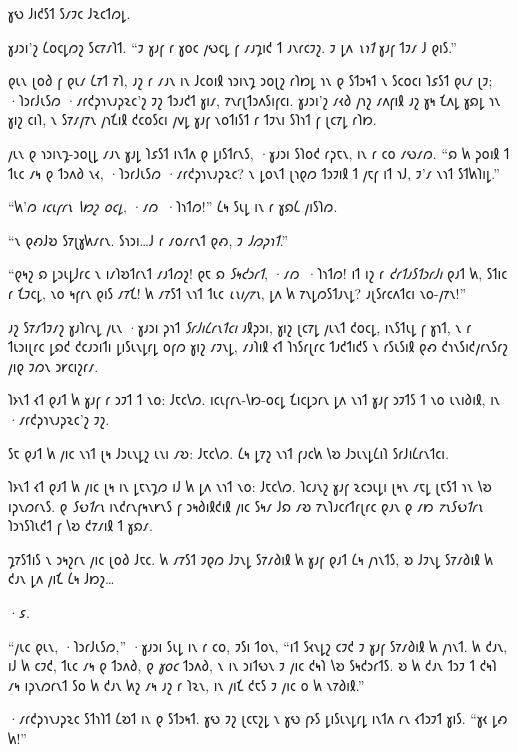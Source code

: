 𐑣𐑻 𐑓𐑦𐑒𐑕𐑑 𐑕𐑥𐑲𐑤 𐑓𐑷𐑤𐑑𐑼𐑛.

𐑣𐑨𐑮𐑦'𐑟 𐑖𐑴𐑤𐑛𐑼𐑟 𐑕𐑤𐑳𐑥𐑐𐑑. “𐑲 𐑣𐑨𐑝 𐑩 𐑣𐑴𐑤 𐑢𐑻𐑤𐑛 𐑝 𐑥𐑨𐑡𐑦𐑒 𐑑 𐑨𐑯𐑩𐑤𐑲𐑟. 𐑲 𐑛𐑵 \emph{𐑯𐑪𐑑} 𐑣𐑨𐑝 𐑑𐑲𐑥 𐑓 𐑞𐑦𐑕.”

𐑞𐑧𐑯 𐑚𐑴𐑔 𐑝 𐑞𐑧𐑥 𐑖𐑳𐑑 𐑳𐑐, 𐑨𐑟 𐑩 𐑥𐑨𐑯 𐑦𐑯 𐑓𐑤𐑴𐑦𐑙 𐑪𐑮𐑦𐑯𐑡 𐑮𐑴𐑚𐑟 𐑩𐑐𐑽𐑛 𐑪𐑯 𐑞 𐑕𐑑𐑮𐑰𐑑 𐑯 𐑕𐑤𐑴𐑤𐑦 𐑐𐑭𐑕𐑑 𐑞𐑧𐑥 𐑚𐑲; ·𐑐𐑮𐑩𐑓𐑧𐑕𐑼 ·𐑥𐑩𐑒𐑜𐑪𐑯𐑨𐑜𐑷𐑤'𐑟 𐑲𐑟 𐑑𐑮𐑨𐑒𐑑 𐑣𐑦𐑥, 𐑳𐑯𐑩𐑚𐑑𐑮𐑵𐑕𐑦𐑝𐑤𐑦. 𐑣𐑨𐑮𐑦'𐑟 𐑥𐑬𐑔 𐑢𐑪𐑟 𐑥𐑵𐑝𐑦𐑙 𐑨𐑟 𐑣𐑰 𐑗𐑵𐑛 𐑣𐑸𐑛 𐑪𐑯 𐑣𐑦𐑟 𐑤𐑦𐑐, 𐑯 𐑕𐑳𐑥𐑢𐑳𐑯 𐑢𐑪𐑗𐑦𐑙 𐑒𐑤𐑴𐑕𐑤𐑦 𐑢𐑫𐑛 𐑣𐑨𐑝 𐑯𐑴𐑑𐑦𐑕𐑑 𐑩 𐑑𐑲𐑯𐑦 𐑕𐑐𐑪𐑑 𐑝 𐑚𐑤𐑳𐑛 𐑩𐑐𐑽.

𐑢𐑧𐑯 𐑞 𐑪𐑮𐑦𐑯𐑡-𐑮𐑴𐑚𐑛 𐑥𐑨𐑯 𐑣𐑨𐑛 𐑐𐑭𐑕𐑑 𐑦𐑯𐑑𐑵 𐑞 𐑛𐑦𐑕𐑑𐑩𐑯𐑕, ·𐑣𐑨𐑮𐑦 𐑕𐑐𐑴𐑒 𐑩𐑜𐑱𐑯, 𐑦𐑯 𐑩 𐑤𐑴 𐑥𐑻𐑥𐑼. “𐑸 𐑿 𐑜𐑴𐑦𐑙 𐑑 𐑑𐑧𐑤 𐑥𐑰 𐑞 𐑑𐑮𐑵𐑔 𐑯𐑬, ·𐑐𐑮𐑩𐑓𐑧𐑕𐑼 ·𐑥𐑩𐑒𐑜𐑪𐑯𐑨𐑜𐑷𐑤? 𐑯 𐑛𐑴𐑯𐑑 𐑚𐑪𐑞𐑼 𐑑𐑮𐑲𐑦𐑙 𐑑 𐑢𐑱𐑝 𐑦𐑑 𐑪𐑓, 𐑲'𐑥 𐑯𐑪𐑑 𐑕𐑑𐑿𐑐𐑦𐑛.”

“𐑿'𐑼 \emph{𐑦𐑤𐑧𐑝𐑩𐑯 𐑘𐑽𐑟 𐑴𐑤𐑛}, ·𐑥𐑼~·𐑐𐑪𐑑𐑼!” 𐑖𐑰 𐑕𐑧𐑛 𐑦𐑯 𐑩 𐑣𐑸𐑖 𐑢𐑦𐑕𐑐𐑼.

“𐑯 𐑞𐑺𐑓𐑹 𐑕𐑳𐑚𐑣𐑿𐑥𐑩𐑯. 𐑕𐑪𐑮𐑦…𐑓 𐑩 𐑥𐑴𐑥𐑩𐑯𐑑 𐑞𐑺, 𐑲 \emph{𐑓𐑼𐑜𐑪𐑑}.”

“𐑞𐑰𐑟 𐑸 𐑛𐑮𐑧𐑛𐑓𐑩𐑤 𐑯 𐑦𐑥𐑐𐑹𐑑𐑩𐑯𐑑 𐑥𐑨𐑑𐑼𐑟! 𐑞𐑱 𐑸 \emph{𐑕𐑰𐑒𐑮𐑩𐑑}, ·𐑥𐑼~·𐑐𐑪𐑑𐑼! 𐑦𐑑 𐑦𐑟 𐑩 \emph{𐑒𐑩𐑑𐑨𐑕𐑑𐑮𐑩𐑓𐑦} 𐑞𐑨𐑑 𐑿, 𐑕𐑑𐑦𐑤 𐑩 𐑗𐑲𐑤𐑛, 𐑯𐑴 𐑰𐑝𐑩𐑯 𐑞𐑦𐑕 𐑥𐑳𐑗! 𐑿 𐑥𐑳𐑕𐑑 𐑯𐑪𐑑 𐑑𐑧𐑤 \emph{𐑧𐑯𐑦𐑢𐑳𐑯}, 𐑛𐑵 𐑿 𐑳𐑯𐑛𐑼𐑕𐑑𐑨𐑯𐑛? 𐑨𐑚𐑕𐑩𐑤𐑵𐑑𐑤𐑦 𐑯𐑴-𐑢𐑳𐑯!”

𐑨𐑟 𐑕𐑳𐑥𐑑𐑲𐑥𐑟 𐑣𐑨𐑐𐑩𐑯𐑛 𐑢𐑧𐑯 ·𐑣𐑨𐑮𐑦 𐑜𐑪𐑑 \emph{𐑕𐑩𐑓𐑦𐑖𐑩𐑯𐑑𐑤𐑦} 𐑨𐑙𐑜𐑮𐑦, 𐑣𐑦𐑟 𐑚𐑤𐑳𐑛 𐑢𐑧𐑯𐑑 𐑒𐑴𐑤𐑛, 𐑦𐑯𐑕𐑑𐑧𐑛 𐑝 𐑣𐑪𐑑, 𐑯 𐑩 𐑑𐑧𐑮𐑦𐑚𐑩𐑤 𐑛𐑸𐑒 𐑒𐑤𐑨𐑮𐑦𐑑𐑦 𐑛𐑦𐑕𐑧𐑯𐑛𐑩𐑛 𐑴𐑝𐑼 𐑣𐑦𐑟 𐑥𐑲𐑯𐑛, 𐑥𐑨𐑐𐑦𐑙 𐑬𐑑 𐑐𐑪𐑕𐑩𐑚𐑩𐑤 𐑑𐑨𐑒𐑑𐑦𐑒𐑕 𐑯 𐑩𐑕𐑧𐑕𐑦𐑙 𐑞𐑺 𐑒𐑪𐑯𐑕𐑦𐑒𐑢𐑩𐑯𐑕𐑩𐑟 𐑢𐑦𐑞 𐑲𐑼𐑯 𐑮𐑾𐑤𐑦𐑟𐑩𐑥.

\begin{em}
    𐑐𐑶𐑯𐑑 𐑬𐑑 𐑞𐑨𐑑 𐑿 𐑣𐑨𐑝 𐑩 𐑮𐑲𐑑 𐑑 𐑯𐑴: 𐑓𐑱𐑤𐑘𐑼. 𐑦𐑤𐑧𐑝𐑩𐑯-𐑘𐑽-𐑴𐑤𐑛 𐑗𐑦𐑤𐑛𐑮𐑩𐑯 𐑛𐑵 𐑯𐑪𐑑 𐑣𐑨𐑝 𐑮𐑲𐑑𐑕 𐑑 𐑯𐑴 𐑧𐑯𐑦𐑔𐑦𐑙, 𐑦𐑯 ·𐑥𐑩𐑒𐑜𐑪𐑯𐑨𐑜𐑷𐑤'𐑟 𐑲𐑟.

    𐑕𐑱 𐑞𐑨𐑑 𐑿 𐑢𐑦𐑤 𐑯𐑪𐑑 𐑚𐑰 𐑓𐑮𐑧𐑯𐑛𐑟 𐑧𐑯𐑦 𐑥𐑹: 𐑓𐑱𐑤𐑘𐑼. 𐑖𐑰 𐑛𐑳𐑟 𐑯𐑪𐑑 𐑝𐑨𐑤𐑿 𐑘𐑹 𐑓𐑮𐑧𐑯𐑛𐑖𐑦𐑐 𐑕𐑩𐑓𐑦𐑖𐑩𐑯𐑑𐑤𐑦.

    𐑐𐑶𐑯𐑑 𐑬𐑑 𐑞𐑨𐑑 𐑿 𐑢𐑦𐑤 𐑚𐑰 𐑦𐑯 𐑛𐑱𐑯𐑡𐑼 𐑦𐑓 𐑿 𐑛𐑵 𐑯𐑪𐑑 𐑯𐑴: 𐑓𐑱𐑤𐑘𐑼. 𐑐𐑤𐑨𐑯𐑟 𐑣𐑨𐑝 𐑷𐑤𐑮𐑧𐑛𐑦 𐑚𐑰𐑯 𐑥𐑱𐑛 𐑚𐑱𐑕𐑑 𐑪𐑯 𐑘𐑹 𐑦𐑜𐑯𐑼𐑩𐑯𐑕. 𐑞 \emph{𐑕𐑻𐑑𐑩𐑯} 𐑦𐑯𐑒𐑩𐑯𐑝𐑰𐑯𐑾𐑯𐑕 𐑝 𐑮𐑰𐑔𐑦𐑙𐑒𐑦𐑙 𐑢𐑦𐑤 𐑕𐑰𐑥 𐑓𐑸 𐑥𐑹 𐑳𐑯𐑐𐑨𐑤𐑩𐑑𐑩𐑚𐑩𐑤 𐑞𐑨𐑯 𐑞 𐑥𐑽 \emph{𐑳𐑯𐑕𐑻𐑑𐑩𐑯} 𐑐𐑮𐑪𐑕𐑐𐑧𐑒𐑑 𐑝 𐑘𐑹 𐑒𐑳𐑥𐑦𐑙 𐑑 𐑣𐑸𐑥.

    𐑡𐑳𐑕𐑑𐑦𐑕 𐑯 𐑮𐑰𐑟𐑩𐑯 𐑢𐑦𐑤 𐑚𐑴𐑔 𐑓𐑱𐑤. 𐑿 𐑥𐑳𐑕𐑑 𐑲𐑞𐑼 𐑓𐑲𐑯𐑛 𐑕𐑳𐑥𐑔𐑦𐑙 𐑿 𐑣𐑨𐑝 𐑞𐑨𐑑 𐑖𐑰 𐑢𐑪𐑯𐑑𐑕, 𐑹 𐑓𐑲𐑯𐑛 𐑕𐑳𐑥𐑔𐑦𐑙 𐑿 𐑒𐑨𐑯 𐑛𐑵 𐑢𐑦𐑗 𐑖𐑰 𐑓𐑽𐑟…
\end{em}

·𐑭.

“𐑢𐑧𐑤 𐑞𐑧𐑯, ·𐑐𐑮𐑩𐑓𐑧𐑕𐑼,” ·𐑣𐑨𐑮𐑦 𐑕𐑧𐑛 𐑦𐑯 𐑩 𐑤𐑴, 𐑲𐑕𐑦 𐑑𐑴𐑯, “𐑦𐑑 𐑕𐑬𐑯𐑛𐑟 𐑤𐑲𐑒 𐑲 𐑣𐑨𐑝 𐑕𐑳𐑥𐑔𐑦𐑙 𐑿 𐑢𐑪𐑯𐑑. 𐑿 𐑒𐑨𐑯, 𐑦𐑓 𐑿 𐑤𐑲𐑒, 𐑑𐑧𐑤 𐑥𐑰 𐑞 𐑑𐑮𐑵𐑔, 𐑞 \emph{𐑣𐑴𐑤} 𐑑𐑮𐑵𐑔, 𐑯 𐑦𐑯 𐑮𐑦𐑑𐑻𐑯 𐑲 𐑢𐑦𐑤 𐑒𐑰𐑐 𐑘𐑹 𐑕𐑰𐑒𐑮𐑩𐑑𐑕. 𐑹 𐑿 𐑒𐑨𐑯 𐑑𐑮𐑲 𐑑 𐑒𐑰𐑐 𐑥𐑰 𐑦𐑜𐑯𐑼𐑩𐑯𐑑 𐑕𐑴 𐑿 𐑒𐑨𐑯 𐑿𐑟 𐑥𐑰 𐑨𐑟 𐑩 𐑐𐑷𐑯, 𐑦𐑯 𐑢𐑦𐑗 𐑒𐑱𐑕 𐑲 𐑢𐑦𐑤 𐑴 𐑿 𐑯𐑳𐑔𐑦𐑙.”

·𐑥𐑩𐑒𐑜𐑪𐑯𐑨𐑜𐑷𐑤 𐑕𐑑𐑪𐑐𐑑 𐑖𐑹𐑑 𐑦𐑯 𐑞 𐑕𐑑𐑮𐑰𐑑. 𐑣𐑻 𐑲𐑟 𐑚𐑤𐑱𐑟𐑛 𐑯 𐑣𐑻 𐑝𐑶𐑕 𐑛𐑦𐑕𐑧𐑯𐑛𐑩𐑛 𐑦𐑯𐑑𐑵 𐑩𐑯 𐑬𐑑𐑮𐑲𐑑 𐑣𐑦𐑕. “𐑣𐑬 𐑛𐑺 𐑿!”

